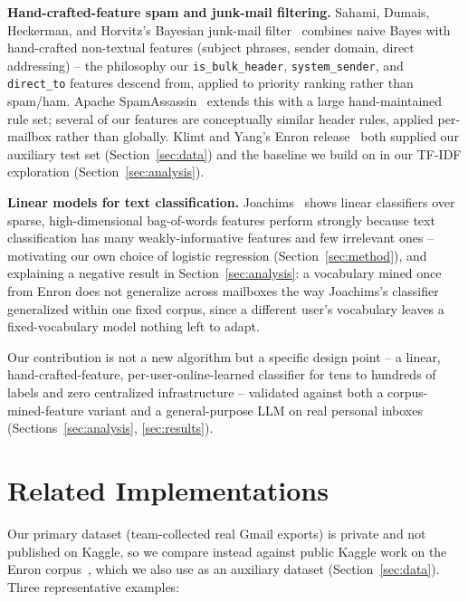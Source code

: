 \documentclass[twoside,twocolumn,10pt]{article}
\begin{document}
\textbf{Hand-crafted-feature spam and junk-mail filtering.} Sahami, Dumais, Heckerman, and Horvitz's Bayesian junk-mail filter~\cite{sahami1998bayesian} combines naive Bayes with hand-crafted non-textual features (subject phrases, sender domain, direct addressing) -- the philosophy our \texttt{is\_bulk\_header}, \texttt{system\_sender}, and \texttt{direct\_to} features descend from, applied to priority ranking rather than spam/ham. Apache SpamAssassin~\cite{spamassassin} extends this with a large hand-maintained rule set; several of our features are conceptually similar header rules, applied per-mailbox rather than globally. Klimt and Yang's Enron release~\cite{klimt2004enron} both supplied our auxiliary test set (Section~\ref{sec:data}) and the baseline we build on in our TF-IDF exploration (Section~\ref{sec:analysis}).

\textbf{Linear models for text classification.} Joachims~\cite{joachims1998text} shows linear classifiers over sparse, high-dimensional bag-of-words features perform strongly because text classification has many weakly-informative features and few irrelevant ones -- motivating our own choice of logistic regression (Section~\ref{sec:method}), and explaining a negative result in Section~\ref{sec:analysis}: a vocabulary mined once from Enron does not generalize across mailboxes the way Joachims's classifier generalized within one fixed corpus, since a different user's vocabulary leaves a fixed-vocabulary model nothing left to adapt.

Our contribution is not a new algorithm but a specific design point -- a linear, hand-crafted-feature, per-user-online-learned classifier for tens to hundreds of labels and zero centralized infrastructure -- validated against both a corpus-mined-feature variant and a general-purpose LLM on real personal inboxes (Sections~\ref{sec:analysis}, \ref{sec:results}).

\section{Related Implementations}

Our primary dataset (team-collected real Gmail exports) is private and not published on Kaggle, so we compare instead against public Kaggle work on the Enron corpus~\cite{klimt2004enron}, which we also use as an auxiliary dataset (Section~\ref{sec:data}). Three representative examples:
\end{document}
